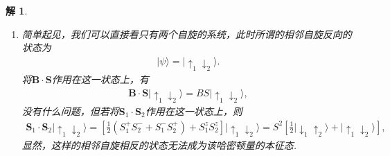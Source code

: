\documentclass[UTF8,10pt,a4paper]{article}
\theoremstyle{Problem}
\theoremstyle{Solution}
\newtheorem*{sol}{解}
\begin{document}
\begin{sol}
\begin{enumerate}
\begin{align}
        \end{align}
        其中$z$是每个自旋周围的相邻自旋数，故所有自旋同向排列是这一哈密顿量的本征态，它对应的本征能量为
        \begin{align}
            E=-JzS^2/2-NgS\mu_BB.
        \end{align}
        \item[(b)] 简单起见，我们可以直接看只有两个自旋的系统，此时所谓的相邻自旋反向的状态为
        \begin{align}
            \lvert\psi\rangle=\lvert\uparrow_1\downarrow_2\rangle.
        \end{align}
        将$\bm{B}\cdot\bm{S}$作用在这一状态上，有
        \begin{align}
            \bm{B}\cdot\bm{S}\lvert\uparrow_1\downarrow_2\rangle=BS\lvert\uparrow_1\downarrow_2\rangle,
        \end{align}
        没有什么问题，但若将$\bm{S}_1\cdot\bm{S}_2$作用在这一状态上，则
        \begin{align}
            \bm{S}_1\cdot\bm{S}_2\lvert\uparrow_1\downarrow_2\rangle=\left[\frac{1}{2}(S_1^+S_2^-+S_1^-S_2^+)+S_1^zS_2^z\right]\lvert\uparrow_1\downarrow_2\rangle=S^2\left[\frac{1}{2}\lvert\downarrow_1\uparrow_2\rangle+\lvert\uparrow_1\downarrow_2\rangle\right],
        \end{align}
        显然，这样的相邻自旋相反的状态无法成为该哈密顿量的本征态.
    \end{enumerate}
\end{sol}
\end{document}
